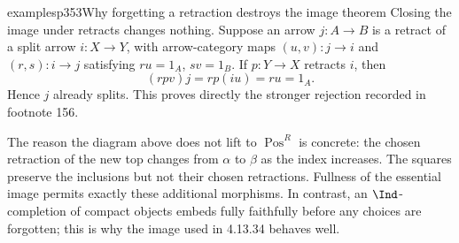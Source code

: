 \begin{dcomment}{examples}{p353}{Why forgetting a retraction destroys the image theorem}
Closing the image under retracts changes nothing. Suppose an arrow $j:A\to B$ is a retract of a split arrow $i:X\to Y$, with arrow-category maps $(u,v):j\to i$ and $(r,s):i\to j$ satisfying $ru=1_A$, $sv=1_B$. If $p:Y\to X$ retracts $i$, then
\[
 (rpv)j=rp(iu)=ru=1_A.
\]
Hence $j$ already splits. This proves directly the stronger rejection recorded in footnote 156.

The reason the diagram above does not lift to $\operatorname{Pos}^{R}$ is concrete: the chosen retraction of the new top changes from $\alpha$ to $\beta$ as the index increases. The squares preserve the inclusions but not their chosen retractions. Fullness of the essential image permits exactly these additional morphisms. In contrast, an $\Ind$-completion of compact objects embeds fully faithfully before any choices are forgotten; this is why the image used in 4.13.34 behaves well.
\end{dcomment}

